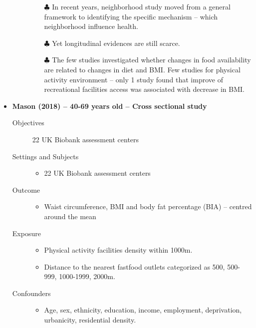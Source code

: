 \documentclass{article}
\begin{document}
\begin{itemize}
\begin{description}
\begin{itemize}
    					\item[$\clubsuit$] In recent years, neighborhood study moved from a general framework to identifying the specific mechanism -- which neighborhood influence health.
    					\item[$\clubsuit$] Yet longitudinal evidences are still scarce.
    					\item[$\clubsuit$] The few studies investigated whether changes in food availability are related to changes in diet and BMI. Few studies for physical activity environment -- only 1 study found that improve of recreational facilities access was associated with decrease in BMI. 
				\end{itemize}
    		\end{description}

	\item {\bf Mason (2018) -- 40-69 years old -- Cross sectional study}
		\begin{description}
			\item[Objectives]\mbox{}\par 
				22 UK Biobank assessment centers
			\item[Settings and Subjects]\mbox{}\par 
				\begin{itemize}
					\item 22 UK Biobank assessment centers
				\end{itemize}
			\item[Outcome]\mbox{}\par
				\begin{itemize}
					\item Waist circumference, BMI and body fat percentage (BIA) -- centred around the mean  	
				\end{itemize}
			\item[Exposure] \mbox{}\par
				\begin{itemize}
					\item Physical activity facilities density within 1000m. 
					\item Distance to the nearest fastfood outlets categorized as 500, 500-999, 1000-1999, 2000m.
				\end{itemize}
			\item[Confounders] \mbox{}\par
				\begin{itemize} 
					\item Age, sex, ethnicity, education, income, employment, deprivation, urbanicity, residential density.

\end{itemize}
\end{description}
\end{itemize}
\end{document}
